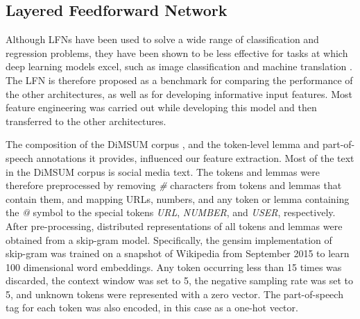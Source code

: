 \documentclass[11pt,a4paper]{article}
\newcommand{\dimsum}{DiMSUM\xspace}
\begin{document}



\subsection{Layered Feedforward Network} \label{LFN1}

Although LFNs have been used to solve a wide range of classification
and regression problems, they have been shown to be less effective for
tasks at which deep learning models excel, such as image
classification \cite{DBLP:conf/nips/KrizhevskySH12} and machine
translation \cite{bahdanau2014neural}. The LFN is therefore proposed
as a benchmark for comparing the performance of the other
architectures, as well as for developing informative input
features. Most feature engineering was carried out while developing
this model and then transferred to the other architectures.

The composition of the \dimsum corpus
\cite{DBLP:conf/semeval/SchneiderHJC16}, and the token-level lemma and
part-of-speech annotations it provides, influenced our feature
extraction. Most of the text in the \dimsum corpus is social media
text. The tokens and lemmas were therefore preprocessed by removing
\emph{\#} characters from tokens and lemmas that contain them, and
mapping URLs, numbers, and any token or lemma containing the \emph{@}
symbol to the special tokens \emph{URL}, \emph{NUMBER}, and
\emph{USER}, respectively. After pre-processing, distributed
representations of all tokens and lemmas were obtained from a
skip-gram \cite{mikolov2013distributed} model.  Specifically, the
gensim \cite{rehurek_lrec} implementation of skip-gram was trained on
a snapshot of Wikipedia from September 2015 to learn 100 dimensional
word embeddings. Any token occurring less than 15 times was discarded,
the context window was set to 5, the negative sampling rate was set to
5, and unknown tokens were represented with a zero vector. The
part-of-speech tag for each token was also encoded, in this case as a
one-hot vector.
\end{document}
